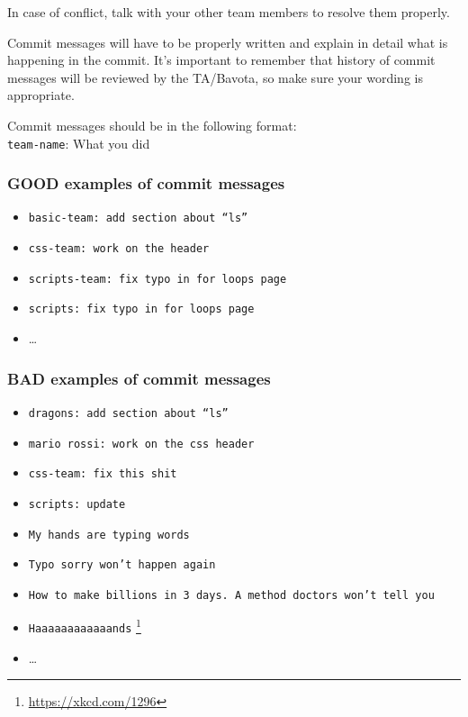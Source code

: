 \documentclass[hidelinks,12pt,a4paper,numbers=enddot]{scrartcl}
\begin{document}
In case of conflict, talk with your other team members to resolve them
properly.

Commit messages will have to be properly written and explain in detail
what is happening in the commit. It's important to remember that history of commit messages will be reviewed by the TA/Bavota, so make sure your wording is appropriate.

Commit messages should be in the following format:\\

\texttt{team-name}: What you did

\subsubsection{GOOD examples of commit messages}

\begin{itemize}
\item \texttt{basic-team: add section about ``ls''}
\item \texttt{css-team: work on the header}
\item \texttt{scripts-team: fix typo in for loops page}
\item \texttt{scripts: fix typo in for loops page}
\item \ldots
\end{itemize}

\subsubsection{BAD examples of commit messages}

\begin{itemize}
\item \texttt{dragons: add section about ``ls''}
\item \texttt{mario rossi: work on the css header}
\item \texttt{css-team: fix this shit}
\item \texttt{scripts: update}
\item \texttt{My hands are typing words}
\item \texttt{Typo sorry won't happen again}
\item \texttt{How to make billions in 3 days. A method doctors won't tell you}
\item \texttt{Haaaaaaaaaaaands} \footnote{\url{https://xkcd.com/1296}}
\item \ldots
\end{itemize}
\end{document}
